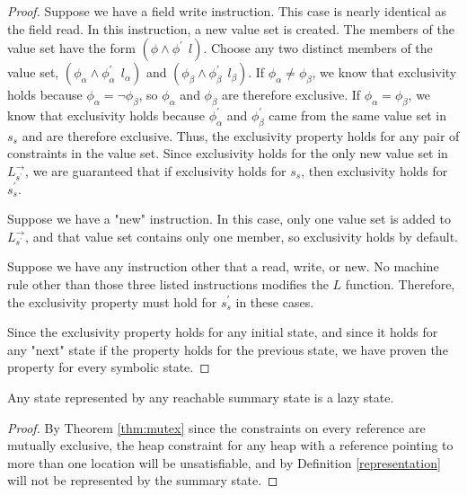 \begin{proof}
Suppose we have a field write instruction. This case is nearly identical as the field read. In this instruction, a new value set is created. The members of the value set have the form $(\phi\wedge \phi^\prime\ \ l)$. Choose any two distinct members of the value set, $(\phi_\alpha \wedge \phi_\alpha^\prime\ \ l_\alpha)$ and $(\phi_\beta \wedge \phi_\beta^\prime\ \ l_\beta)$. If $\phi_\alpha \ne \phi_\beta$, we know that exclusivity holds because $\phi_\alpha = \neg \phi_\beta$, so $\phi_\alpha$ and $\phi_\beta$ are therefore exclusive. If $\phi_\alpha = \phi_\beta$, we know that exclusivity holds because $\phi_\alpha^\prime$ and $\phi_\beta^\prime$ came from the same value set in $s_s$ and are therefore exclusive. Thus, the exclusivity property holds for any pair of constraints in the value set. Since exclusivity holds for the only new value set in $L_{s^\prime}^\rightarrow$, we are guaranteed that if exclusivity holds for $s_s$, then exclusivity holds for $s_s^\prime$.

Suppose we have a "new" instruction. In this case, only one value set is added to $L_{s^\prime}^\rightarrow$, and that value set contains only one member, so exclusivity holds by default.

Suppose we have any instruction other that a read, write, or new. No machine rule other than those three listed instructions modifies the $L$ function. Therefore, the exclusivity property must hold for $s_s^\prime$ in these cases.

Since the exclusivity property holds for any initial state, and since it holds for any "next" state if the property holds for the previous state, we have proven the property for every symbolic state.
\end{proof}

\begin{corollary}
Any state represented by any reachable summary state is a lazy state.
\end{corollary}

\begin{proof}
By Theorem \ref{thm:mutex} since the constraints on every reference are mutually exclusive, the heap constraint for any heap with a reference pointing to more than one location will be unsatisfiable, and by Definition \ref{representation} will not be represented by the summary state.
\end{proof}

